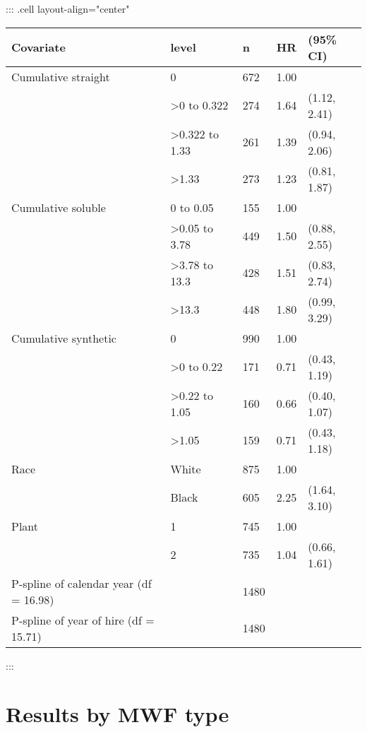 \documentclass[
  11pt,
  letterpaper,
  DIV=11,
  numbers=noendperiod]{scrartcl}
\theoremstyle{remark}\newtheorem*{claim}{Claim}
\begin{document}
\begin{table}[H]
\centering
::: {.cell layout-align="center"}
\begin{tabular}{lllll}
  \toprule
Covariate & level & n & HR & (95\% CI) \\ 
  \midrule
Cumulative straight & 0 & 672 & 1.00 &  \\ 
   & >0 to 0.322 & 274 & 1.64 & (1.12, 2.41) \\ 
   & >0.322 to 1.33 & 261 & 1.39 & (0.94, 2.06) \\ 
   & >1.33 & 273 & 1.23 & (0.81, 1.87) \\ 
  Cumulative soluble & 0 to 0.05 & 155 & 1.00 &  \\ 
   & >0.05 to 3.78 & 449 & 1.50 & (0.88, 2.55) \\ 
   & >3.78 to 13.3 & 428 & 1.51 & (0.83, 2.74) \\ 
   & >13.3 & 448 & 1.80 & (0.99, 3.29) \\ 
  Cumulative synthetic & 0 & 990 & 1.00 &  \\ 
   & >0 to 0.22 & 171 & 0.71 & (0.43, 1.19) \\ 
   & >0.22 to 1.05 & 160 & 0.66 & (0.40, 1.07) \\ 
   & >1.05 & 159 & 0.71 & (0.43, 1.18) \\ 
  Race & White & 875 & 1.00 &  \\ 
   & Black & 605 & 2.25 & (1.64, 3.10) \\ 
  Plant & 1 & 745 & 1.00 &  \\ 
   & 2 & 735 & 1.04 & (0.66, 1.61) \\ 
  P-spline of calendar year (df = 16.98) &  & 1480 &  &  \\ 
  P-spline of year of hire (df = 15.71) &  & 1480 &  &  \\ 
   \bottomrule
\end{tabular}
:::
\end{table}

\hypertarget{results-by-mwf-type}{%
\section{Results by MWF type}\label{results-by-mwf-type}}
\end{document}

